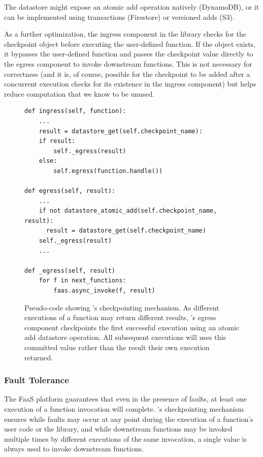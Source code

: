 The datastore might expose an atomic add operation natively (DynamoDB), or it
can be implemented using transactions (Firestore) or versioned adds (S3).

As a further optimization, the ingress component in the \name{} library checks
for the checkpoint object before executing the user-defined function. If the
object exists, it bypasses the user-defined function and passes the checkpoint
value directly to the egress component to invoke downstream functions. This is
not necessary for correctness (and it is, of course, possible for the checkpoint
to be added after a concurrent execution checks for its existence in the ingress
component) but helps reduce computation that we know to be unused.

\begin{figure}
\begin{verbatim}
def ingress(self, function):
    ...
    result = datastore_get(self.checkpoint_name):
    if result:
        self._egress(result)
    else:
        self.egress(function.handle())

def egress(self, result):
    ...
    if not datastore_atomic_add(self.checkpoint_name, result):
      result = datastore_get(self.checkpoint_name)
    self._egress(result)
    ...

def _egress(self, result)
    for f in next_functions:
        faas.async_invoke(f, result)
\end{verbatim}
\label{fig:design:checkpoint}
\caption{Pseudo-code showing \name{}'s checkpointing mechanism. As different
executions of a function may return different results, \name{}'s egress
component checkpoints the first successful execution using an atomic add
datastore operation. All subsequent executions will uses this committed value
rather than the result their own execution returned.}
\end{figure}

\subsubsection{Fault Tolerance}

The FaaS platform guarantees that even in the presence of faults, at least one
execution of a function invocation will complete. \name{}'s checkpointing
mechanism ensures while faults may occur at any point during the execution of a
function's user code or the \name{} library, and while downstream functions may
be invoked multiple times by different executions of the same invocation, a
single value is always used to invoke downstream functions.

